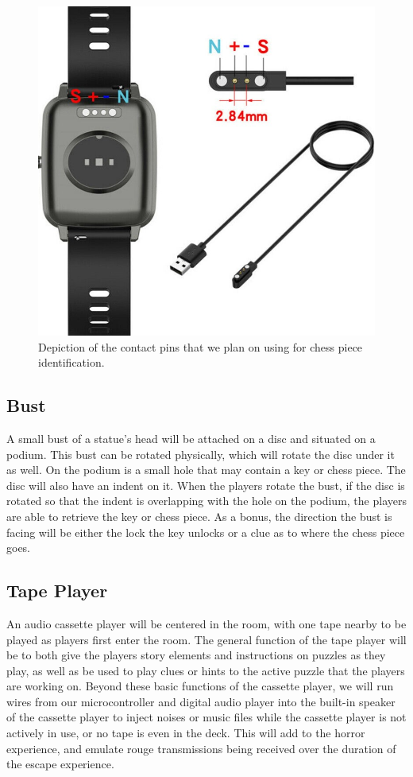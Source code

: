 \documentclass[conference]{IEEEtran}
\begin{document}
\begin{figure}[ht]
    \centering
    \includegraphics[width=0.85\columnwidth]{Images/pebble charger.jpg}
    \caption{Depiction of the contact pins that we plan on using for chess piece identification.}
\end{figure}

\subsection{Bust}
A small bust of a statue's head will be attached on a disc and situated
on a podium. This bust can be rotated physically, which will rotate the
disc under it as well. On the podium is a small hole that may contain a key
or chess piece. The disc will also have an indent on it. When the players
rotate the bust, if the disc is rotated so that the indent is overlapping
with the hole on the podium, the players are able to retrieve the key
or chess piece. As a bonus, the direction the bust is facing will be either
the lock the key unlocks or a clue as to where the chess piece goes.

\subsection{Tape Player}
An audio cassette player will be centered in the room, with one tape nearby
to be played as players first enter the room. The general function of the tape
player will be to both give the players story elements and instructions on
puzzles as they play, as well as be used to play clues or hints to the active
puzzle that the players are working on. Beyond these basic functions of the
cassette player, we will run wires from our microcontroller and digital audio
player into the built-in speaker of the cassette player to inject noises or music
files while the cassette player is not actively in use, or no tape is even in the
deck. This will add to the horror experience, and emulate rouge transmissions
being received over the duration of the escape experience.
\end{document}
